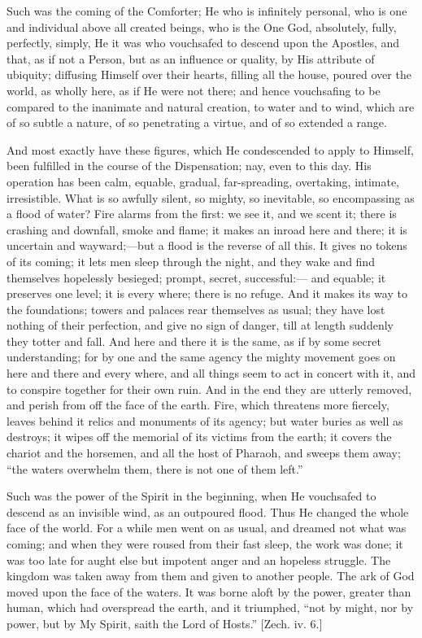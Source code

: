 Such was the coming of the Comforter; He who is infinitely
personal, who is one and individual above all created beings, who is
the One God, absolutely, fully, perfectly, simply, He it was who
vouchsafed to descend upon the Apostles, and that, as if not a Person,
but as an influence or quality, by His attribute of ubiquity;
diffusing Himself over their hearts, filling all the house, poured
over the world, as wholly here, as if He were not there; and hence
vouchsafing to be compared to the inanimate and natural creation, to
water and to wind, which are of so subtle a nature, of so penetrating
a virtue, and of so extended a range.

And most exactly have these figures, which He condescended to apply
to Himself, been fulfilled in the course of the Dispensation; nay,
even to this day. His operation has been calm, equable, gradual,
far-spreading, overtaking, intimate, irresistible. What is so awfully
silent, so mighty, so inevitable, so encompassing as a flood of water?
Fire alarms from the first: we see it, and we scent it; there is
crashing and downfall, smoke and flame; it makes an inroad here and
there; it is uncertain and wayward;—but a flood is the reverse of
all this. It gives no tokens of its coming; it lets men sleep through
the night, and they wake and find themselves hopelessly besieged;
prompt, secret, successful:— and equable; it preserves one level; it
is every where; there is no refuge. And it makes its way to the
foundations; towers and palaces rear themselves as usual; they have
lost nothing of their perfection, and give no sign of danger, till at
length suddenly they totter and fall. And here and there it is the
same, as if by some secret understanding; for by one and the same
agency the mighty movement goes on here and there and every where, and
all things seem to act in concert with it, and to conspire together
for their own ruin. And in the end they are utterly removed, and
perish from off the face of the earth. Fire, which threatens more
fiercely, leaves behind it relics and monuments of its agency; but
water buries as well as destroys; it wipes off the memorial of its
victims from the earth; it covers the chariot and the horsemen, and
all the host of Pharaoh, and sweeps them away; ``the waters
overwhelm them, there is not one of them left.''

Such was the power of the Spirit in the beginning, when He
vouchsafed to descend as an invisible wind, as an outpoured flood.
Thus He changed the whole face of the world. For a while men went on
as usual, and dreamed not what was coming; and when they were roused
from their fast sleep, the work was done; it was too late for aught
else but impotent anger and an hopeless struggle. The kingdom was
taken away from them and given to another people. The ark of God moved
upon the face of the waters. It was borne aloft by the power, greater
than human, which had overspread the earth, and it triumphed,
``not by might, nor by power, but by My Spirit, saith the Lord of
Hosts.'' [Zech. iv. 6.]

